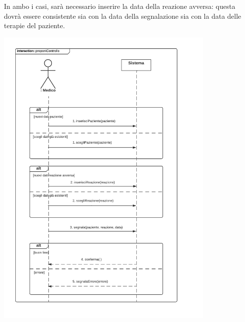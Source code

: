 \documentclass{article}
\begin{document}
\newpage
In ambo i casi, sarà necessario inserire la data della reazione avversa: questa dovrà essere consistente sia con la data della segnalazione sia con la data delle terapie del paziente.
    \begin{center}
        \includegraphics[width=0.80\textwidth]{pictures/SDMedico1_Segnalazione.png}
    \end{center}

\newpage
\end{document}
